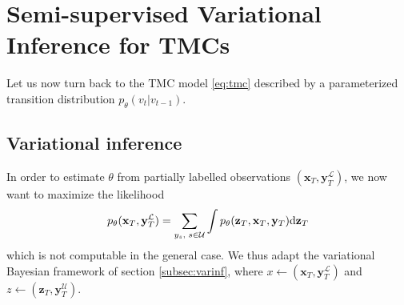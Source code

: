 \documentclass{article}
\def\x{{\mathbf x}}
\def\z{{\mathbf z}}
\def\y{{\mathbf y}}
\def\yl{{\mathbf y}_{T}^{\mathcal{L}}}
\def\yu{{\mathbf y}_{T}^{\mathcal{U}}}
\def\p{p_{\theta}}
\def\q{q_\phi}
\def\U{\mathcal{U}}
\newcommand{\katy}[1]{\todo[inline,color=pink]{#1 --- Katy}}
\begin{document}

\section{Semi-supervised Variational Inference for TMCs}
\label{sec:vi_tmc}
Let us now turn back to the TMC model \eqref{eq:tmc} described by a parameterized transition
distribution
$\p(v_t|v_{t-1})$.

\subsection{Variational inference}

In order to estimate $\theta$ from 
partially labelled observations 
$(\x_T,\yl)$, we now want to maximize
the likelihood 
$$\p(\x_T, \yl)=\sum_{y_s \text{, }  s \in \U} \int \p(\z_T,\x_T,\y_T) {\rm d}\z_T$$
which is not computable in the general case.
We thus adapt the variational Bayesian
framework of section \ref{subsec:varinf},
where $x \leftarrow (\x_T, \yl)$ and
$z \leftarrow (\z_T, \yu)$. 
\end{document}
